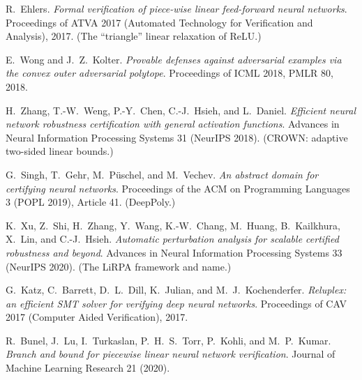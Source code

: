 
R.~Ehlers.
\emph{Formal verification of piece-wise linear feed-forward neural
networks}.
Proceedings of ATVA 2017 (Automated Technology for Verification and
Analysis), 2017. (The ``triangle'' linear relaxation of ReLU.)

E.~Wong and J.~Z.~Kolter.
\emph{Provable defenses against adversarial examples via the convex
outer adversarial polytope}.
Proceedings of ICML 2018, PMLR 80, 2018.

H.~Zhang, T.-W.~Weng, P.-Y.~Chen, C.-J.~Hsieh, and L.~Daniel.
\emph{Efficient neural network robustness certification with general
activation functions}.
Advances in Neural Information Processing Systems 31 (NeurIPS 2018).
(CROWN: adaptive two-sided linear bounds.)

G.~Singh, T.~Gehr, M.~P\"uschel, and M.~Vechev.
\emph{An abstract domain for certifying neural networks}.
Proceedings of the ACM on Programming Languages 3 (POPL 2019),
Article 41. (DeepPoly.)

K.~Xu, Z.~Shi, H.~Zhang, Y.~Wang, K.-W.~Chang, M.~Huang,
B.~Kailkhura, X.~Lin, and C.-J.~Hsieh.
\emph{Automatic perturbation analysis for scalable certified
robustness and beyond}.
Advances in Neural Information Processing Systems 33 (NeurIPS 2020).
(The LiRPA framework and name.)

G.~Katz, C.~Barrett, D.~L.~Dill, K.~Julian, and M.~J.~Kochenderfer.
\emph{Reluplex: an efficient SMT solver for verifying deep neural
networks}.
Proceedings of CAV 2017 (Computer Aided Verification), 2017.

R.~Bunel, J.~Lu, I.~Turkaslan, P.~H.~S.~Torr, P.~Kohli, and
M.~P.~Kumar.
\emph{Branch and bound for piecewise linear neural network
verification}.
Journal of Machine Learning Research 21 (2020).
